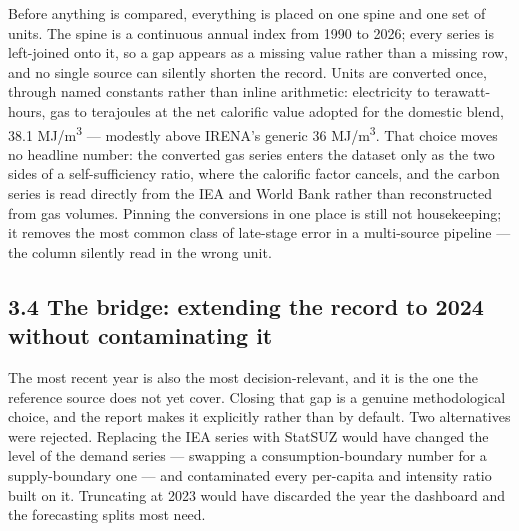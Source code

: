 \documentclass[10pt,twocolumn]{article}
\begin{document}
Before anything is compared, everything is placed on one spine and one set of units. The spine is a continuous annual index from 1990 to 2026; every series is left-joined onto it, so a gap appears as a missing value rather than a missing row, and no single source can silently shorten the record. Units are converted once, through named constants rather than inline arithmetic: electricity to terawatt-hours, gas to terajoules at the net calorific value adopted for the domestic blend, 38.1 MJ/m\textsuperscript{3} --- modestly above IRENA's generic 36 MJ/m\textsuperscript{3}. That choice moves no headline number: the converted gas series enters the dataset only as the two sides of a self-sufficiency ratio, where the calorific factor cancels, and the carbon series is read directly from the IEA and World Bank rather than reconstructed from gas volumes. Pinning the conversions in one place is still not housekeeping; it removes the most common class of late-stage error in a multi-source pipeline --- the column silently read in the wrong unit.

\subsection*{3.4 The bridge: extending the record to 2024 without contaminating it}

The most recent year is also the most decision-relevant, and it is the one the reference source does not yet cover. Closing that gap is a genuine methodological choice, and the report makes it explicitly rather than by default. Two alternatives were rejected. Replacing the IEA series with StatSUZ would have changed the level of the demand series --- swapping a consumption-boundary number for a supply-boundary one --- and contaminated every per-capita and intensity ratio built on it. Truncating at 2023 would have discarded the year the dashboard and the forecasting splits most need.
\end{document}

